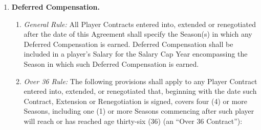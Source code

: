 \documentclass[
]{book}
\providecommand{\tightlist}{%
  \setlength{\itemsep}{0pt}\setlength{\parskip}{0pt}}
\begin{document}
\begin{enumerate}
\def\labelenumi{(\alph{enumi})}
\tightlist
\item
  \textbf{Deferred Compensation.}

  \begin{enumerate}
  \def\labelenumii{(\arabic{enumii})}
  \tightlist
  \item
    \emph{General Rule:} All Player Contracts entered into, extended or renegotiated after the date of this Agreement shall specify the Season(s) in which any Deferred Compensation is earned. Deferred Compensation shall be included in a player's Salary for the Salary Cap Year encompassing the Season in which such Deferred Compensation is earned.
  \item
    \emph{Over 36 Rule:} The following provisions shall apply to any Player Contract entered into, extended, or renegotiated that, beginning with the date such Contract, Extension or Renegotiation is signed, covers four (4) or more Seasons, including one (1) or more Seasons commencing after such player will reach or has reached age thirty-six (36) (an ``Over 36 Contract''):


\end{enumerate}
\end{enumerate}
\end{document}
